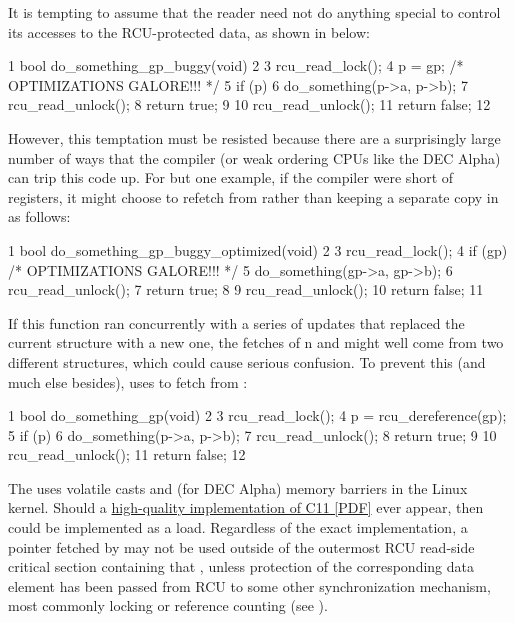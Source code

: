 It is tempting to assume that the reader need not do anything special to
control its accesses to the RCU-protected data, as shown in
 below:

\begin{VerbatimN}
       1 bool do_something_gp_buggy(void)
       2 {
       3   rcu_read_lock();
       4   p = gp;  /* OPTIMIZATIONS GALORE!!! */
       5   if (p) {
       6     do_something(p->a, p->b);
       7     rcu_read_unlock();
       8     return true;
       9   }
      10   rcu_read_unlock();
      11   return false;
      12 }
\end{VerbatimN}

However, this temptation must be resisted because there are a
surprisingly large number of ways that the compiler (or weak ordering
CPUs like the DEC Alpha) can trip this code up.
For but one example, if
the compiler were short of registers, it might choose to refetch from
 rather than keeping a separate copy in~ as follows:

\begin{VerbatimN}
       1 bool do_something_gp_buggy_optimized(void)
       2 {
       3   rcu_read_lock();
       4   if (gp) { /* OPTIMIZATIONS GALORE!!! */
       5     do_something(gp->a, gp->b);
       6     rcu_read_unlock();
       7     return true;
       8   }
       9   rcu_read_unlock();
      10   return false;
      11 }
\end{VerbatimN}

If this function ran concurrently with a series of updates that replaced
the current structure with a new one, the fetches of n and
 might well come from two different structures, which could
cause serious confusion.
To prevent this (and much else besides),
 uses  to fetch from :

\begin{VerbatimN}
       1 bool do_something_gp(void)
       2 {
       3   rcu_read_lock();
       4   p = rcu_dereference(gp);
       5   if (p) {
       6     do_something(p->a, p->b);
       7     rcu_read_unlock();
       8     return true;
       9   }
      10   rcu_read_unlock();
      11   return false;
      12 }
\end{VerbatimN}

The  uses volatile casts and (for DEC Alpha) memory
barriers in the Linux kernel.
Should a
\href{http://www.rdrop.com/users/paulmck/RCU/consume.2015.07.13a.pdf}
{high-quality implementation of C11  [PDF]}
ever appear, then  could be implemented as a
 load. Regardless of the exact implementation, a
pointer fetched by  may not be used outside of the
outermost RCU read-side critical section containing that
, unless protection of the corresponding data
element has been passed from RCU to some other synchronization
mechanism, most commonly locking or reference counting
(see ).

